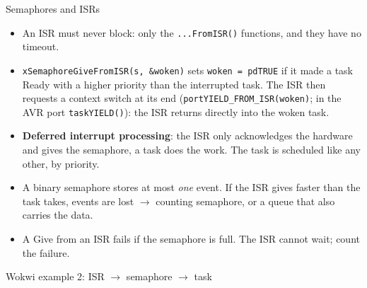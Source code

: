 \begin{frame}{Semaphores and ISRs}
  \begin{itemize}
    \item An ISR must never block: only the \texttt{...FromISR()} functions, and they have no timeout.
    \item \texttt{xSemaphoreGiveFromISR(s, \&woken)} sets \texttt{woken = pdTRUE} if it made a task Ready with a higher priority than the interrupted task. The ISR then requests a context switch at its end (\texttt{portYIELD\_FROM\_ISR(woken)}; in the AVR port \texttt{taskYIELD()}): the ISR returns directly into the woken task.
    \item \textbf{Deferred interrupt processing}: the ISR only acknowledges the hardware and gives the semaphore, a task does the work. The task is scheduled like any other, by priority.
    \item A binary semaphore stores at most \emph{one} event. If the ISR gives faster than the task takes, events are lost $\rightarrow$ counting semaphore, or a queue that also carries the data.
    \item A Give from an ISR fails if the semaphore is full. The ISR cannot wait; count the failure.
  \end{itemize}
\end{frame}

\begin{frame}[fragile]{Wokwi example 2: ISR $\rightarrow$ semaphore $\rightarrow$ task}
\iftoggle{slides}{%
  \begin{columns}[T]
    \begin{column}{0.56\textwidth}
      
    \end{column}
    \begin{column}{0.42\textwidth}
      \small
      \begin{itemize}
        \item Button on pin 2 (INT0), LED on pin 12.
        \item The ISR only gives the semaphore; the task does the work.
        \item \texttt{taskYIELD()}: the woken task runs directly after the ISR, not at the next tick.
        \item Logic analyzer: D0 = ISR, D1 = task. Measure the time from the ISR to the task.
        \item Try: remove \texttt{taskYIELD()} and measure again.
      \end{itemize}
    \end{column}
  \end{columns}
}{%
  \wokwiexample{ex02_isr_semaphore}{Button interrupt wakes a task}{lst:ex02}%
}
\end{frame}

